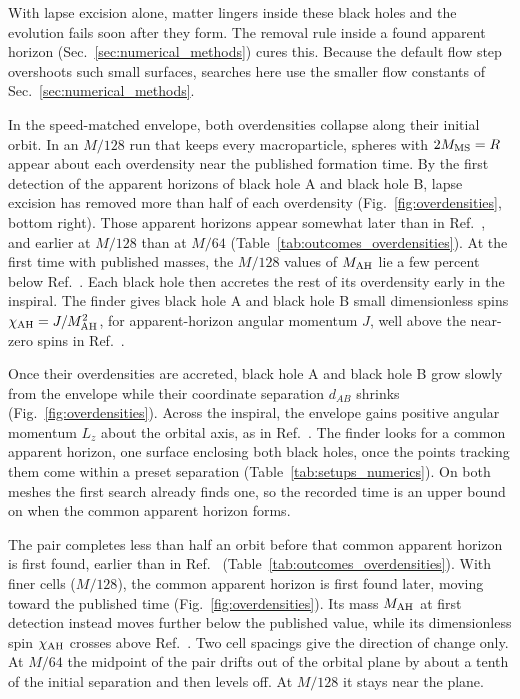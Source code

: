 With lapse excision alone, matter lingers inside these black holes and the evolution fails soon after they form. The removal rule inside a found apparent horizon (Sec.~\ref{sec:numerical_methods}) cures this. Because the default flow step overshoots such small surfaces, searches here use the smaller flow constants of Sec.~\ref{sec:numerical_methods}.

In the speed-matched envelope, both overdensities collapse along their initial orbit. In an $M/128$ run that keeps every macroparticle, spheres with $2M_{\rm MS}=R$ appear about each overdensity near the published formation time. By the first detection of the apparent horizons of black hole A and black hole B, lapse excision has removed more than half of each overdensity (Fig.~\ref{fig:overdensities}, bottom right). Those apparent horizons appear somewhat later than in Ref.~\cite{Wu:2026nrpic}, and earlier at $M/128$ than at $M/64$ (Table~\ref{tab:outcomes_overdensities}). At the first time with published masses, the $M/128$ values of $M_{\rm AH}$ lie a few percent below Ref.~\cite{Wu:2026nrpic}. Each black hole then accretes the rest of its overdensity early in the inspiral. The finder gives black hole A and black hole B small dimensionless spins $\chi_{\rm AH} = J/M_{\rm AH}^2$, for apparent-horizon angular momentum $J$, well above the near-zero spins in Ref.~\cite{Wu:2026nrpic}.

Once their overdensities are accreted, black hole A and black hole B grow slowly from the envelope while their coordinate separation $d_{AB}$ shrinks (Fig.~\ref{fig:overdensities}). Across the inspiral, the envelope gains positive angular momentum $L_z$ about the orbital axis, as in Ref.~\cite{Wu:2026nrpic}. The finder looks for a common apparent horizon, one surface enclosing both black holes, once the points tracking them come within a preset separation (Table~\ref{tab:setups_numerics}). On both meshes the first search already finds one, so the recorded time is an upper bound on when the common apparent horizon forms.

The pair completes less than half an orbit before that common apparent horizon is first found, earlier than in Ref.~\cite{Wu:2026nrpic} (Table~\ref{tab:outcomes_overdensities}). With finer cells ($M/128$), the common apparent horizon is first found later, moving toward the published time (Fig.~\ref{fig:overdensities}). Its mass $M_{\rm AH}$ at first detection instead moves further below the published value, while its dimensionless spin $\chi_{\rm AH}$ crosses above Ref.~\cite{Wu:2026nrpic}. Two cell spacings give the direction of change only. At $M/64$ the midpoint of the pair drifts out of the orbital plane by about a tenth of the initial separation and then levels off. At $M/128$ it stays near the plane.

